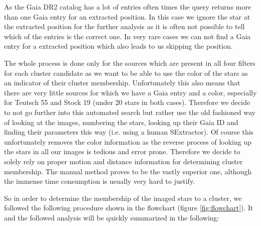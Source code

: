 \documentclass{article}
\begin{document}
As the Gaia DR2 catalog has a lot of entries often times the query returns more than one Gaia entry for an extracted position. In this case we ignore the star at the extracted position for the further analysis as it is often not possible to tell which of the entries is the correct one. In very rare cases we can not find a Gaia entry for a extracted position which also leads to us skipping the position. 

The whole process is done only for the sources which are present in all four filters for each cluster candidate as we want to be able to use the color of the stars as an indicator of their cluster membership. Unfortunately this also means that there are very little sources for which we have a Gaia entry and a color, especially for Teutsch 55 and Stock 19 (under 20 stars in both cases). Therefore we decide to not go further into this automated search but rather use the old fashioned way of looking at the images, numbering the stars, looking up their Gaia ID and finding their parameters this way (i.e. using a human SExtractor). %
Of course this unfortunately removes the color information as the reverse process of looking up the stars in all our images is tedious and error prone. Therefore we decide to solely rely on proper motion and distance information for determining cluster membership. The manual method proves to be the vastly superior one, although the immense time consumption is usually very hard to justify.  

So in order to determine the membership of the imaged stars to a cluster, we followed the following procedure shown in the flowchart (figure \ref{fig:flowchart}). It and the followed analysis will be quickly summarized in the following:
\end{document}
